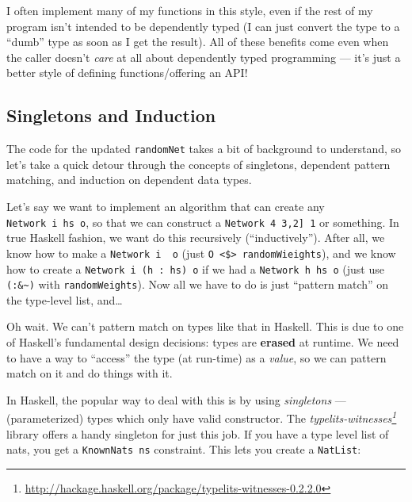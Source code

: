 \documentclass[]{article}
\renewcommand{\href}[2]{#2\footnote{\url{#1}}}
\begin{document}
I often implement many of my functions in this style, even if the rest of my
program isn't intended to be dependently typed (I can just convert the type to a
``dumb'' type as soon as I get the result). All of these benefits come even when
the caller doesn't \emph{care} at all about dependently typed programming ---
it's just a better style of defining functions/offering an API!

\subsection{Singletons and Induction}\label{singletons-and-induction}

The code for the updated \texttt{randomNet} takes a bit of background to
understand, so let's take a quick detour through the concepts of singletons,
dependent pattern matching, and induction on dependent data types.

Let's say we want to implement an algorithm that can create any
\texttt{Network\ i\ hs\ o}, so that we can construct a
\texttt{Network\ 4\ \textquotesingle{}{[}3,2{]}\ 1} or something. In true
Haskell fashion, we want do this recursively (``inductively''). After all, we
know how to make a \texttt{Network\ i\ \textquotesingle{}{[}{]}\ o} (just
\texttt{O\ \textless{}\$\textgreater{}\ randomWieights}), and we know how to
create a \texttt{Network\ i\ (h\ \textquotesingle{}:\ hs)\ o} if we had a
\texttt{Network\ h\ hs\ o} (just use \texttt{(:\&\textasciitilde{})} with
\texttt{randomWeights}). Now all we have to do is just ``pattern match'' on the
type-level list, and\ldots{}

Oh wait. We can't pattern match on types like that in Haskell. This is due to
one of Haskell's fundamental design decisions: types are \textbf{erased} at
runtime. We need to have a way to ``access'' the type (at run-time) as a
\emph{value}, so we can pattern match on it and do things with it.

In Haskell, the popular way to deal with this is by using \emph{singletons} ---
(parameterized) types which only have valid constructor. The
\emph{\href{http://hackage.haskell.org/package/typelits-witnesses-0.2.2.0}{typelits-witnesses}}
library offers a handy singleton for just this job. If you have a type level
list of nats, you get a \texttt{KnownNats\ ns} constraint. This lets you create
a \texttt{NatList}:
\end{document}
